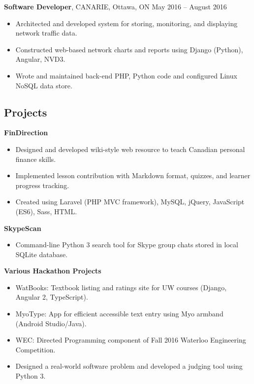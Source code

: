 \documentclass[]{article}
\begin{document}
\textbf{Software Developer}, CANARIE, Ottawa, ON May 2016 -- August 2016

\begin{itemize}
\item
  Architected and developed system for storing, monitoring, and
  displaying network traffic data.
\item
  Constructed web-based network charts and reports using Django
  (Python), Angular, NVD3.
\item
  Wrote and maintained back-end PHP, Python code and configured Linux
  NoSQL data store.
\end{itemize}

\subsection{Projects}

\textbf{FinDirection}

\begin{itemize}
\item
  Designed and developed wiki-style web resource to teach Canadian
  personal finance skills.
\item
  Implemented lesson contribution with Markdown format, quizzes, and
  learner progress tracking.
\item
  Created using Laravel (PHP MVC framework), MySQL, jQuery, JavaScript
  (ES6), Sass, HTML.
\end{itemize}

\textbf{SkypeScan}

\begin{itemize}
\item
  Command-line Python 3 search tool for Skype group chats stored in
  local SQLite database.
\end{itemize}

\textbf{Various Hackathon Projects}

\begin{itemize}
\item
  WatBooks: Textbook listing and ratings site for UW courses (Django,
  Angular 2, TypeScript).
\item
  MyoType: App for efficient accessible text entry using Myo armband
  (Android Studio/Java).
\item
  WEC: Directed Programming component of Fall 2016 Waterloo Engineering
  Competition.
\end{itemize}

\begin{itemize}
\item
  Designed a real-world software problem and developed a judging tool
  using Python 3.
\end{itemize}
\end{document}
